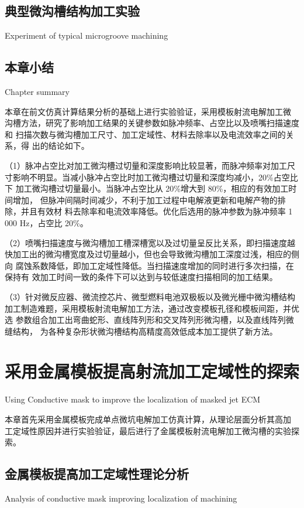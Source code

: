 \documentclass[
  type=doctor
]{../gdutthesis}
\begin{document}
\section{典型微沟槽结构加工实验}{Experiment of typical microgroove machining}

\section{本章小结}{Chapter summary}

本章在前文仿真计算结果分析的基础上进行实验验证，采用模板射流电解加工微
沟槽方法，研究了影响加工结果的关键参数如脉冲频率、占空比以及喷嘴扫描速度和
扫描次数与微沟槽加工尺寸、加工定域性、材料去除率以及电流效率之间的关系，得
出的结论如下。

（1）脉冲占空比对加工微沟槽过切量和深度影响比较显著，而脉冲频率对加工尺
寸影响不明显。当减小脉冲占空比时加工微沟槽过切量和深度均减小，20\%占空比下
加工微沟槽过切量最小。当脉冲占空比从 20\%增大到 80\%，相应的有效加工时间增加，
但脉冲间隔时间减少，不利于加工过程中电解液更新和电解产物的排除，并且有效材
料去除率和电流效率降低。优化后选用的脉冲参数为脉冲频率 1 000 Hz，占空比 20\%。

（2）喷嘴扫描速度与微沟槽加工槽深槽宽以及过切量呈反比关系，即扫描速度越
快加工出的微沟槽宽度及过切量越小，但也会导致微沟槽加工深度过浅，相应的侧向
腐蚀系数降低，即加工定域性降低。当扫描速度增加的同时进行多次扫描，在保持有
效加工时间一致的条件下可以达到与较低速度扫描相同的加工结果。

（3）针对微反应器、微流控芯片、微型燃料电池双极板以及微光栅中微沟槽结构
加工制造难题，采用模板射流电解加工方法，通过改变模板孔径和模板间距，并优选
参数组合加工出弯曲蛇形、直线阵列形和交叉阵列形微沟槽，以及直线阵列微缝结构，
为各种复杂形状微沟槽结构高精度高效低成本加工提供了新方法。

\chapter{采用金属模板提高射流加工定域性的探索}{Using Conductive mask to improve the localization of masked jet ECM}

本章首先采用金属模板完成单点微坑电解加工仿真计算，从理论层面分析其高加
工定域性原因并进行实验验证，最后进行了金属模板射流电解加工微沟槽的实验探索。

\section{金属模板提高加工定域性理论分析}{Analysis of conductive mask improving localization of machining}
\end{document}
